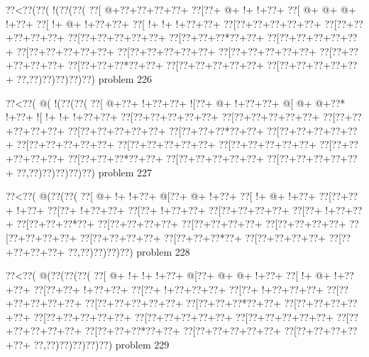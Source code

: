 \vbox{\vbox{\goo
\0??<\0??(\0??(\- !(\0??(\0??(
\0??[\- @+\0??+\0??+\0??+\0??+
\0??[\0??+\- @+\- !+\- !+\0??+
\0??[\- @+\- @+\- @+\- !+\0??+
\0??[\- !+\- @+\- !+\0??+\0??+
\0??[\- !+\- !+\- !+\0??+\0??+
\0??[\0??+\0??+\0??+\0??+\0??+
\0??[\0??+\0??+\0??+\0??+\0??+
\0??[\0??+\0??+\0??+\0??+\0??+
\0??[\0??+\0??+\0??*\0??+\0??+
\0??[\0??+\0??+\0??+\0??+\0??+
\0??[\0??+\0??+\0??+\0??+\0??+
\0??[\0??+\0??+\0??+\0??+\0??+
\0??[\0??+\0??+\0??+\0??+\0??+
\0??[\0??+\0??+\0??+\0??+\0??+
\0??[\0??+\0??+\0??*\0??+\0??+
\0??[\0??+\0??+\0??+\0??+\0??+
\0??[\0??+\0??+\0??+\0??+\0??+
\0??,\0??)\0??)\0??)\0??)\0??)
}
\hfil problem 226\hfil\break
}

\vbox{\vbox{\goo
\0??<\0??(\- @(\- !(\0??(\0??(
\0??[\- @+\0??+\- !+\0??+\0??+
\- ![\0??+\- @+\- !+\0??+\0??+
\- @[\- @+\- @+\0??*\- !+\0??+
\- ![\- !+\- !+\- !+\0??+\0??+
\0??[\0??+\0??+\0??+\0??+\0??+
\0??[\0??+\0??+\0??+\0??+\0??+
\0??[\0??+\0??+\0??+\0??+\0??+
\0??[\0??+\0??+\0??+\0??+\0??+
\0??[\0??+\0??+\0??*\0??+\0??+
\0??[\0??+\0??+\0??+\0??+\0??+
\0??[\0??+\0??+\0??+\0??+\0??+
\0??[\0??+\0??+\0??+\0??+\0??+
\0??[\0??+\0??+\0??+\0??+\0??+
\0??[\0??+\0??+\0??+\0??+\0??+
\0??[\0??+\0??+\0??*\0??+\0??+
\0??[\0??+\0??+\0??+\0??+\0??+
\0??[\0??+\0??+\0??+\0??+\0??+
\0??,\0??)\0??)\0??)\0??)\0??)
}
\hfil problem 227\hfil\break
}

\vbox{\vbox{\goo
\0??<\0??(\- @(\0??(\0??(
\0??[\- @+\- !+\- !+\0??+
\- @[\0??+\- @+\- !+\0??+
\0??[\- !+\- @+\- !+\0??+
\0??[\0??+\0??+\- !+\0??+
\0??[\0??+\- !+\0??+\0??+
\0??[\0??+\- !+\0??+\0??+
\0??[\0??+\0??+\0??+\0??+
\0??[\0??+\- !+\0??+\0??+
\0??[\0??+\0??+\0??*\0??+
\0??[\0??+\0??+\0??+\0??+
\0??[\0??+\0??+\0??+\0??+
\0??[\0??+\0??+\0??+\0??+
\0??[\0??+\0??+\0??+\0??+
\0??[\0??+\0??+\0??+\0??+
\0??[\0??+\0??+\0??*\0??+
\0??[\0??+\0??+\0??+\0??+
\0??[\0??+\0??+\0??+\0??+
\0??,\0??)\0??)\0??)\0??)
}
\hfil problem 228\hfil\break
}

\vbox{\vbox{\goo
\0??<\0??(\- @(\0??(\0??(\0??(
\0??[\- @+\- !+\- !+\- !+\0??+
\- @[\0??+\- @+\- @+\- !+\0??+
\0??[\- !+\- @+\- !+\0??+\0??+
\0??[\0??+\0??+\- !+\0??+\0??+
\0??[\0??+\- !+\0??+\0??+\0??+
\0??[\0??+\- !+\0??+\0??+\0??+
\0??[\0??+\0??+\0??+\0??+\0??+
\0??[\0??+\0??+\0??+\0??+\0??+
\0??[\0??+\0??+\0??*\0??+\0??+
\0??[\0??+\0??+\0??+\0??+\0??+
\0??[\0??+\0??+\0??+\0??+\0??+
\0??[\0??+\0??+\0??+\0??+\0??+
\0??[\0??+\0??+\0??+\0??+\0??+
\0??[\0??+\0??+\0??+\0??+\0??+
\0??[\0??+\0??+\0??*\0??+\0??+
\0??[\0??+\0??+\0??+\0??+\0??+
\0??[\0??+\0??+\0??+\0??+\0??+
\0??,\0??)\0??)\0??)\0??)\0??)
}
\hfil problem 229\hfil\break
}

